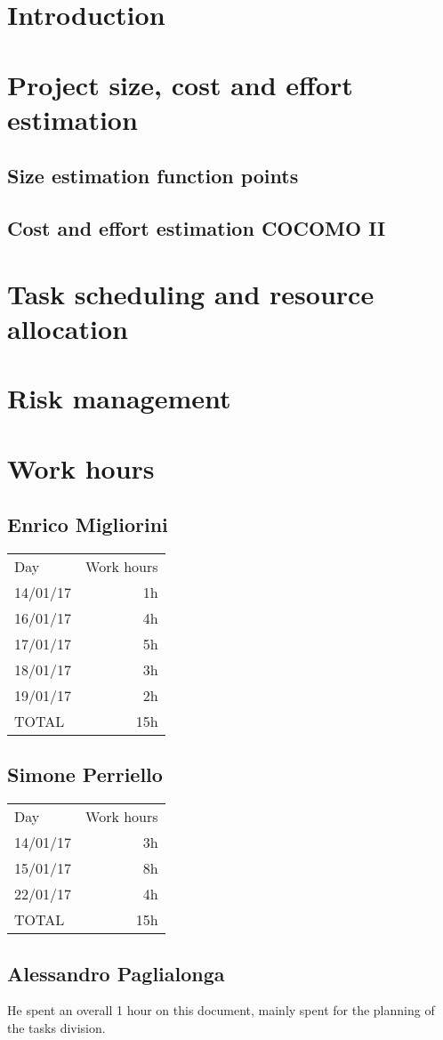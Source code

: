 \section{Introduction}



\clearpage
\section{Project size, cost and effort estimation}\label{sec:project-size,-cost-and-effort-estimation}
\subsection{Size estimation function points}\label{sec:function-points}


\clearpage
\subsection{Cost and effort estimation COCOMO II}\label{sec:cocomo}


\clearpage
\section{Task scheduling and resource allocation}\label{sec:task-scheduling}


\clearpage
\section{Risk management}\label{sec:risk-management}


\section{Work hours}
\subsection{Enrico Migliorini}
\begin{tabular}{l r}
	Day & Work hours \\
	14/01/17 & 1h \\
	16/01/17 & 4h \\
	17/01/17 & 5h \\
	18/01/17 & 3h \\
	19/01/17 & 2h \\ \hline
	TOTAL & 15h
\end{tabular}

\subsection{Simone Perriello}
\begin{tabular}{l r}
	Day & Work hours \\
	14/01/17 & 3h \\
	15/01/17 & 8h \\ \hline
	22/01/17 & 4h \\ \hline
	TOTAL & 15h \\
\end{tabular}

\subsection{Alessandro Paglialonga}
He spent an overall 1 hour on this document, mainly spent for the planning of the tasks division.
